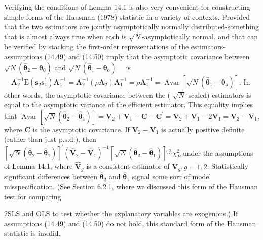 \documentclass[10pt]{article}
\begin{document}
Verifying the conditions of Lemma 14.1 is also very convenient for constructing simple forms of the Hausman (1978) statistic in a variety of contexts. Provided that the two estimators are jointly asymptotically normally distributed-something that is almost always true when each is $\sqrt{N}$-asymptotically normal, and that can be verified by stacking the first-order representations of the estimators-assumptions (14.49) and (14.50) imply that the asymptotic covariance between $\sqrt{N}\left(\hat{\boldsymbol{\theta}}_{2}-\boldsymbol{\theta}_{0}\right)$ and $\sqrt{N}\left(\hat{\boldsymbol{\theta}}_{1}-\boldsymbol{\theta}_{\mathrm{o}}\right) \quad$ is $\quad \mathbf{A}_{2}^{-1} \mathrm{E}\left(\mathbf{s}_{2} \mathbf{s}_{1}^{\prime}\right) \mathbf{A}_{1}^{-1}=\mathbf{A}_{2}^{-1}\left(\rho \mathbf{A}_{2}\right) \mathbf{A}_{1}^{-1}=\rho \mathbf{A}_{1}^{-1}=\operatorname{Avar}\left[\sqrt{N}\left(\hat{\boldsymbol{\theta}}_{1}-\boldsymbol{\theta}_{\mathrm{o}}\right)\right]$. In other words, the asymptotic covariance between the ( $\sqrt{N}$-scaled) estimators is equal to the asymptotic variance of the efficient estimator. This equality implies that $\operatorname{Avar}\left[\sqrt{N}\left(\hat{\boldsymbol{\theta}}_{2}-\hat{\boldsymbol{\theta}}_{1}\right)\right]=\mathbf{V}_{2}+\mathbf{V}_{1}-\mathbf{C}-\mathbf{C}^{\prime}=\mathbf{V}_{2}+\mathbf{V}_{1}-2 \mathbf{V}_{1}=\mathbf{V}_{2}-\mathbf{V}_{1}$, where $\mathbf{C}$ is the asymptotic covariance. If $\mathbf{V}_{2}-\mathbf{V}_{1}$ is actually positive definite (rather than just p.s.d.), then $\left[\sqrt{N}\left(\hat{\boldsymbol{\theta}}_{2}-\hat{\boldsymbol{\theta}}_{1}\right)\right]^{\prime}\left(\hat{\mathbf{V}}_{2}-\hat{\mathbf{V}}_{1}\right)^{-1}\left[\sqrt{N}\left(\hat{\boldsymbol{\theta}}_{2}-\hat{\boldsymbol{\theta}}_{1}\right)\right] \stackrel{a}{\sim} \chi_{P}^{2}$ under the assumptions of Lemma 14.1, where $\hat{\mathbf{V}}_{g}$ is a consistent estimator of $\mathbf{V}_{g}, g=1,2$. Statistically significant differences between $\hat{\boldsymbol{\theta}}_{2}$ and $\hat{\boldsymbol{\theta}}_{1}$ signal some sort of model misspecification. (See Section 6.2.1, where we discussed this form of the Hausman test for comparing

2SLS and OLS to test whether the explanatory variables are exogenous.) If assumptions (14.49) and (14.50) do not hold, this standard form of the Hausman statistic is invalid.
\end{document}
